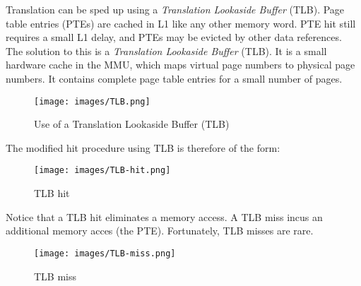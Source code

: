\documentclass[toc]{../cs-classes/cs-classes}
\begin{document}
Translation can be sped up using a \emph{Translation Lookaside Buffer} (TLB). Page table entries (PTEs) are cached in L1 like any other memory word. PTE hit still requires a small L1 delay, and PTEs may be evicted by other data references. The solution to this is a \emph{Translation Lookaside Buffer} (TLB). It is a small hardware cache in the MMU, which maps virtual page numbers to physical page numbers. It contains complete page table entries for a small number of pages.
\begin{figure}[H]
    \centering
    \texttt{[image: images/TLB.png]}
    \caption{Use of a Translation Lookaside Buffer (TLB)}
\end{figure}
The modified hit procedure using TLB is therefore of the form:
\begin{figure}[H]
    \centering
    \texttt{[image: images/TLB-hit.png]}
    \caption{TLB hit}
\end{figure}
Notice that a TLB hit eliminates a memory access. A TLB miss incus an additional memory acces (the PTE). Fortunately, TLB misses are rare.
\begin{figure}[H]
    \centering
    \texttt{[image: images/TLB-miss.png]}
    \caption{TLB miss}
\end{figure}
\end{document}
